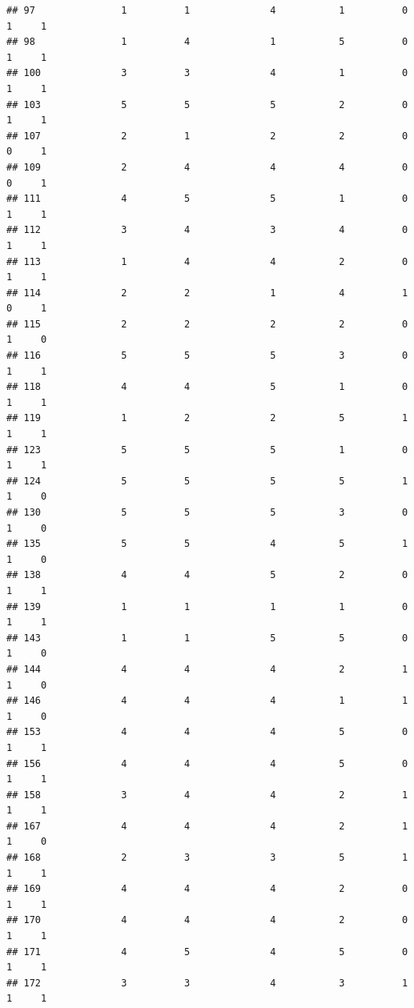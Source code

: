 \documentclass[
]{article}
\begin{document}
\begin{verbatim}
## 97               1          1              4           1          0    1     1
## 98               1          4              1           5          0    1     1
## 100              3          3              4           1          0    1     1
## 103              5          5              5           2          0    1     1
## 107              2          1              2           2          0    0     1
## 109              2          4              4           4          0    0     1
## 111              4          5              5           1          0    1     1
## 112              3          4              3           4          0    1     1
## 113              1          4              4           2          0    1     1
## 114              2          2              1           4          1    0     1
## 115              2          2              2           2          0    1     0
## 116              5          5              5           3          0    1     1
## 118              4          4              5           1          0    1     1
## 119              1          2              2           5          1    1     1
## 123              5          5              5           1          0    1     1
## 124              5          5              5           5          1    1     0
## 130              5          5              5           3          0    1     0
## 135              5          5              4           5          1    1     0
## 138              4          4              5           2          0    1     1
## 139              1          1              1           1          0    1     1
## 143              1          1              5           5          0    1     0
## 144              4          4              4           2          1    1     0
## 146              4          4              4           1          1    1     0
## 153              4          4              4           5          0    1     1
## 156              4          4              4           5          0    1     1
## 158              3          4              4           2          1    1     1
## 167              4          4              4           2          1    1     0
## 168              2          3              3           5          1    1     1
## 169              4          4              4           2          0    1     1
## 170              4          4              4           2          0    1     1
## 171              4          5              4           5          0    1     1
## 172              3          3              4           3          1    1     1

\end{verbatim}
\end{document}
